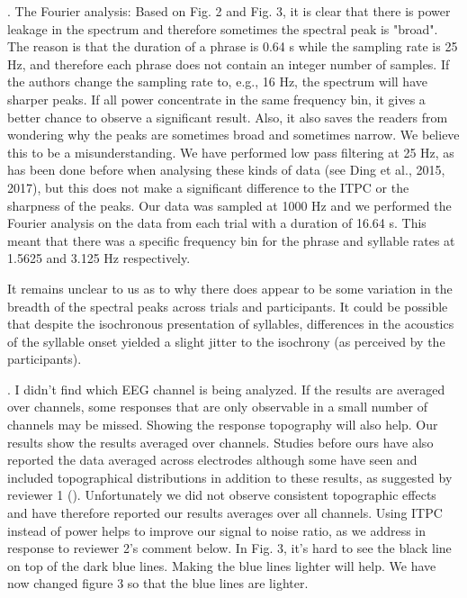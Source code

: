 \documentclass[10pt,letterpaper]{article}
\begin{document}
\color{black}
\newline
{}. The Fourier analysis: Based on Fig. 2 and Fig. 3, it is clear that there is power leakage in the spectrum and therefore sometimes the spectral peak is "broad". The reason is that the duration of a phrase is 0.64 s while the sampling rate is 25 Hz, and therefore each phrase does not contain an integer number of samples. If the authors change the sampling rate to, e.g., 16 Hz, the spectrum will have sharper peaks. If all power concentrate in the same frequency bin, it gives a better chance to observe a significant result. Also, it also saves the readers from wondering why the peaks are sometimes broad and sometimes narrow.
\color{blue}
We believe this to be a misunderstanding. We have performed low pass filtering at 25 Hz, as has been done before when analysing these kinds of data (see Ding et al., 2015, 2017), but this does not make a significant difference to the ITPC or the sharpness of the peaks. Our data was sampled at 1000 Hz and we performed the Fourier analysis on the data from each trial with a duration of 16.64 s. This meant that there was a specific frequency bin for the phrase and syllable rates at 1.5625 and 3.125 Hz respectively.

It remains unclear to us as to why there does appear to be some variation in the breadth of the spectral peaks across trials and participants. It could be possible that despite the isochronous presentation of syllables, differences in the acoustics of the syllable onset yielded a slight jitter to the isochrony (as perceived by the participants).

\color{black}
\newline
{}. I didn't find which EEG channel is being analyzed. If the results are averaged over channels, some responses that are only observable in a small number of channels may be missed. Showing the response topography will also help.
\color{blue}
Our results show the results averaged over channels. Studies before ours have also reported the data averaged across electrodes although some have seen and included topographical distributions in addition to these results, as suggested by reviewer 1 (\cite{DingEtAl2016, DingEtAl2017}). Unfortunately we did not observe consistent topographic effects and have therefore reported our results averages over all channels. Using ITPC instead of power helps to improve our signal to noise ratio, as we address in response to reviewer 2’s comment below.
\color{black}
\newline
\noindent
 In Fig. 3, it's hard to see the black line on top of the dark blue lines. Making the blue lines lighter will help.
 \color{blue}
We have now changed figure 3 so that the blue lines are lighter. 
\end{document}
